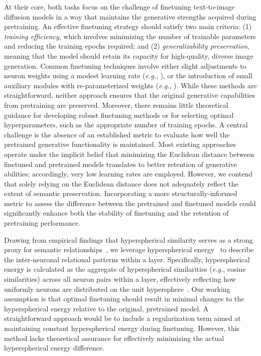 At their core, both tasks focus on the challenge of finetuning text-to-image diffusion models in a way that maintains the generative strengths acquired during pretraining. An effective finetuning strategy should satisfy two main criteria: (1) \emph{training efficiency}, which involves minimizing the number of trainable parameters and reducing the training epochs required; and (2) \emph{generalizability preservation}, meaning that the model should retain its capacity for high-quality, diverse image generation. Common finetuning techniques involve either slight adjustments to neuron weights using a modest learning rate (\emph{e.g.}, \cite{ruiz2023dreambooth}), or the introduction of small auxiliary modules with re-parameterized weights (\emph{e.g.}, \cite{hulora2022,zhang2023adding}). While these methods are straightforward, neither approach ensures that the original generative capabilities from pretraining are preserved. Moreover, there remains little theoretical guidance for developing robust finetuning methods or for selecting optimal hyperparameters, such as the appropriate number of training epochs. A central challenge is the absence of an established metric to evaluate how well the pretrained generative functionality is maintained. Most existing approaches operate under the implicit belief that minimizing the Euclidean distance between finetuned and pretrained models translates to better retention of generative abilities; accordingly, very low learning rates are employed. However, we contend that solely relying on the Euclidean distance does not adequately reflect the extent of semantic preservation. Incorporating a more structurally-informed metric to assess the difference between the pretrained and finetuned models could significantly enhance both the stability of finetuning and the retention of pretraining performance.

Drawing from empirical findings that hyperspherical similarity serves as a strong proxy for semantic relationships~\cite{liu2017deep,liu2018decoupled,chen2020angular}, we leverage hyperspherical energy~\cite{liu2018learning} to describe the inter-neuronal relational patterns within a layer. Specifically, hyperspherical energy is calculated as the aggregate of hyperspherical similarities (\emph{e.g.}, cosine similarities) across all neuron pairs within a layer, effectively reflecting how uniformly neurons are distributed on the unit hypersphere~\cite{liu2021learning}. Our working assumption is that optimal finetuning should result in minimal changes to the hyperspherical energy relative to the original, pretrained model. A straightforward approach would be to include a regularization term aimed at maintaining constant hyperspherical energy during finetuning. However, this method lacks theoretical assurance for effectively minimizing the actual hyperspherical energy difference. 

